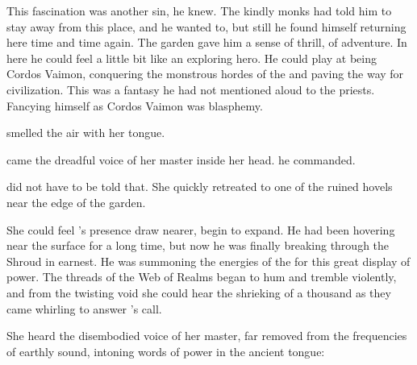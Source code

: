 This fascination was another sin, he knew. 
The kindly monks had told him to stay away from this place, and he wanted to, but still he found himself returning here time and time again. 
The garden gave him a sense of thrill, of adventure. 
In here he could feel a little bit like an exploring hero. 
He could play at being Cordos Vaimon, conquering the monstrous hordes of the \wylde and paving the way for \human civilization. 
This was a fantasy he had not mentioned aloud to the priests. 
Fancying himself as Cordos Vaimon was blasphemy. 








\begin{comment}
  \subsection{Criseis in the dead garden}
\end{comment}
\new
\Criseis smelled the air with her tongue. 



 came the dreadful voice of her master inside her head. 
 he commanded. 

\Criseis did not have to be told that.
She quickly retreated to one of the ruined hovels near the edge of the {garden}. 


She could feel \Ishnaruchaefir's presence draw nearer, begin to expand. 
He had been hovering near the surface for a long time, but now he was finally breaking through the Shroud in earnest.
He was summoning the energies of the \xss for this great display of power. 
The threads of the Web of Realms began to hum and tremble violently, and from the twisting void she could hear the shrieking of a thousand \daemons as they came whirling to answer \Ishnaruchaefir's call. 

She heard the disembodied voice of her master, far removed from the frequencies of earthly sound, intoning words of power in the ancient \TrueDraconic tongue:


